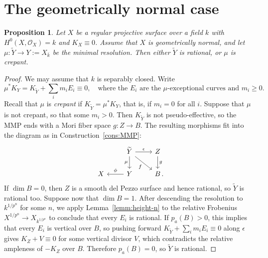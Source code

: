 \documentclass[10pt,abstract=true]{scrartcl}
\numberwithin{equation}{section}
\newtheorem{proposition}[theorem]{Proposition}
\theoremstyle{definition}
\theoremstyle{remark}
\begin{document}
\section{The geometrically normal case}\label{sec:caseA}
\begin{proposition}\label{prop:geo-normal-alb}%
  Let $X$ be a regular projective surface over a field $k$ with $H^0(X,\mathcal O_X)=k$ and $K_X\equiv0$.
  Assume that $X$ is geometrically normal, and let $\mu\colon\widetilde Y\to Y:=X_{\bar k}$ be the minimal resolution.
  Then either $\widetilde Y$ is rational, or $\mu$ is crepant.
\end{proposition}
\begin{proof}
  We may assume that $k$ is separably closed.
  Write
  \[
  \mu^*K_Y=K_{\widetilde Y}+\sum_i m_iE_i\equiv0, \quad\text{where the $E_i$ are the $\mu$-exceptional curves and } m_i\ge 0.
  \]
  Recall that $\mu$ is \emph{crepant} if $K_{\widetilde Y}=\mu^*K_Y$, that is, if $m_i=0$ for all $i$.
  Suppose that $\mu$ is not crepant, so that some $m_i>0$.
  Then $K_{\widetilde Y}$ is not pseudo-effective, so the MMP ends with a Mori fiber space $g\colon Z\to B$.
  The resulting morphisms fit into the diagram as in Construction~\ref{cons:MMP}:
  \[
    \begin{tikzcd}
      & \widetilde Y \ar[d,"\mu"'] \ar[r,"\epsilon"]
        \ar[dr,"f"'] & Z \ar[d,"g"] \\
      X & Y \ar[l,"\phi"'] & B \rlap{\,.}
    \end{tikzcd}
  \]
  If $\dim B=0$, then $Z$ is a smooth del Pezzo surface and hence rational, so $\widetilde Y$ is rational too.
  Suppose now that $\dim B=1$.
  After descending the resolution to $k^{1/p^n}$ for some $n$, we apply Lemma~\ref{lemm:height-n} to the relative Frobenius $X^{1/p^n}\to X_{k^{1/p^n}}$ to conclude that every $E_i$ is rational.
  If $p_a(B)>0$, this implies that every $E_i$ is vertical over $B$, so pushing forward $K_{\widetilde Y}+\sum_i m_iE_i\equiv0$ along $\epsilon$ gives $K_Z+V\equiv0$ for some vertical divisor $V$, which contradicts the relative ampleness of $-K_Z$ over $B$.
  Therefore $p_a(B)=0$, so $\widetilde Y$ is rational.
\end{proof}
\end{document}
